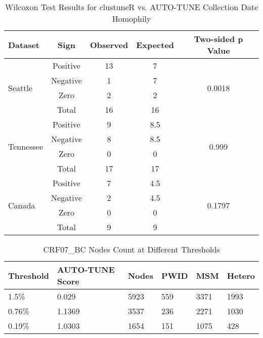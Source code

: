 \documentclass[utf8]{FrontiersinHarvard} %
\begin{document}
\begin{table}[h]
	\centering
	\caption{Wilcoxon Test Results for clustuneR vs. AUTO-TUNE Collection Date Homophily}
	\label{table:wilcoxon-test}
	\begin{tabular}{lcccc}
		\hline
		\textbf{Dataset}           & \textbf{Sign} & \textbf{Observed} & \textbf{Expected} & \textbf{Two-sided p Value} \\
		\hline
		\multirow{4}{*}{Seattle}   & Positive      & 13                & 7                 & \multirow{4}{*}{0.0018}    \\
		                           & Negative      & 1                 & 7                 &                            \\
		                           & Zero          & 2                 & 2                 &                            \\
		                           & Total         & 16                & 16                &                            \\
		\hline
		\multirow{4}{*}{Tennessee} & Positive      & 9                 & 8.5               & \multirow{4}{*}{0.999}     \\
		                           & Negative      & 8                 & 8.5               &                            \\
		                           & Zero          & 0                 & 0                 &                            \\
		                           & Total         & 17                & 17                &                            \\
		\hline
		\multirow{4}{*}{Canada}    & Positive      & 7                 & 4.5               & \multirow{4}{*}{0.1797}    \\
		                           & Negative      & 2                 & 4.5               &                            \\
		                           & Zero          & 0                 & 0                 &                            \\
		                           & Total         & 9                 & 9                 &                            \\
		\hline
	\end{tabular}
\end{table}

\begin{table}[h!]
	\centering
	\begin{tabularx}{\textwidth}{|X|X|X|X|X|X|}
		\hline
		Threshold & AUTO-TUNE Score & Nodes & PWID & MSM  & Hetero \\
		\hline
		1.5\%     & 0.029           & 5923  & 559  & 3371 & 1993   \\
		0.76\%    & 1.1369          & 3537  & 236  & 2271 & 1030   \\
		0.19\%    & 1.0303          & 1654  & 151  & 1075 & 428    \\
		\hline
	\end{tabularx}
	\caption{CRF07\_BC Nodes Count at Different Thresholds}
	\label{table:combined}
\end{table}
\end{document}

